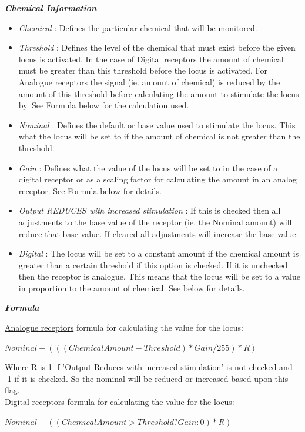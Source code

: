 \documentclass[11pt,twoside,a4paper]{article}
\begin{document}
\textbf{\textit{Chemical Information}}
\begin{itemize}
	\item[] \emph{Chemical} : Defines the particular chemical that will be monitored. %
	\item[] \emph{Threshold} : Defines the level of the chemical that must exist before the given locus is activated. In the case of Digital receptors the amount of chemical must be greater than this threshold before the locus is activated. For Analogue receptors the signal (ie. amount of chemical) is reduced by the amount of this threshold before calculating the amount to stimulate the locus by. See Formula below for the calculation used.
	\item[] \emph{Nominal} : Defines the default or base value used to stimulate the locus. This what the locus will be set to if the amount of chemical is not greater than the threshold. 
	\item[] \emph{Gain} : Defines what the value of the locus will be set to in the case of a digital receptor or as a scaling factor for calculating the amount in an analog receptor. See Formula below for details.
	\item[] \emph{Output REDUCES with increased stimulation} : If this is checked then all adjustments to the base value of the receptor (ie. the Nominal amount) will reduce that base value. If cleared all adjustments will increase the base value.
	\item[] \emph{Digital} : The locus will be set to a constant amount if the chemical amount is greater than a certain threshold if this option is checked. If it is unchecked then the receptor is analogue. This means that the locus will be set to a value in proportion to the amount of chemical. See below for details.
\end{itemize}

\textbf{\textit{Formula}}

\underline{Analogue receptors} formula for calculating the value for the locus:

$Nominal + (((ChemicalAmount - Threshold) * Gain/255) * R)$

Where R is 1 if 'Output Reduces with increased stimulation' is not checked and -1 if it is checked. So the nominal will be reduced or increased based upon this flag.~\\

\underline{Digital receptors} formula for calculating the value for the locus:

$Nominal + ((ChemicalAmount > Threshold ? Gain : 0) * R)$
\end{document}
